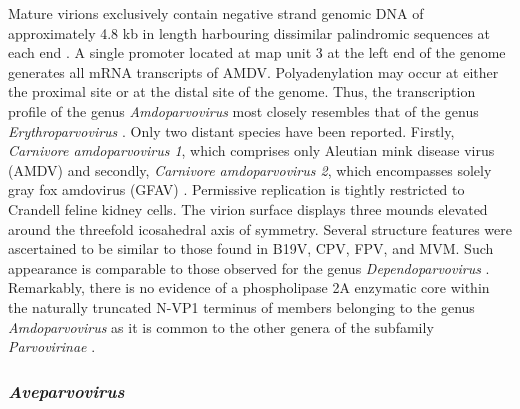 Mature virions exclusively contain negative strand genomic DNA of approximately 4.8 kb in length harbouring dissimilar palindromic sequences at each end \cite{pmid6252342, pmid2843669}. A single promoter located at map unit 3 at the left end of the genome generates all mRNA transcripts of AMDV. Polyadenylation may occur at either the proximal site or at the distal site of the genome. Thus, the transcription profile of the genus \textit{Amdoparvovirus} most closely resembles  that of the genus \textit{Erythroparvovirus} \cite{pmid16378968}.  
Only two distant species have been reported. Firstly, \textit{Carnivore amdoparvovirus 1}, which comprises only Aleutian mink disease virus (AMDV) and secondly, \textit{Carnivore amdoparvovirus 2}, which encompasses solely gray fox amdovirus (GFAV) \cite{pmid22000359}. 
Permissive replication is tightly restricted to Crandell feline kidney cells. The virion surface displays three mounds elevated around the threefold icosahedral axis of symmetry. Several structure features were ascertained to be similar to those found in B19V, CPV, FPV, and MVM. Such appearance is comparable to those observed for the genus \textit{Dependoparvovirus} \cite{pmid10400786}. Remarkably, there is no evidence of a phospholipase 2A enzymatic core within the naturally truncated N-VP1 terminus of members belonging to the genus \textit{Amdoparvovirus} as it is common to the other genera of the subfamily \textit{Parvovirinae} \cite{icvt}. 



\subsubsection{\textit{Aveparvovirus}}

